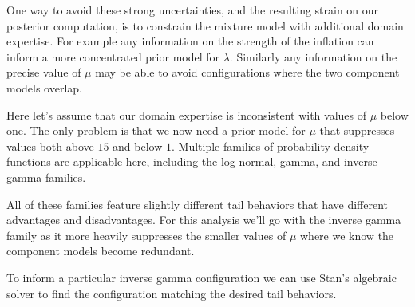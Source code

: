 \documentclass[
  letterpaper,
  DIV=11,
  numbers=noendperiod]{scrartcl}
\begin{document}
One way to avoid these strong uncertainties, and the resulting strain on
our posterior computation, is to constrain the mixture model with
additional domain expertise. For example any information on the strength
of the inflation can inform a more concentrated prior model for
\(\lambda\). Similarly any information on the precise value of \(\mu\)
may be able to avoid configurations where the two component models
overlap.

Here let's assume that our domain expertise is inconsistent with values
of \(\mu\) below one. The only problem is that we now need a prior model
for \(\mu\) that suppresses values both above \(15\) and below \(1\).
Multiple families of probability density functions are applicable here,
including the log normal, gamma, and inverse gamma families.

All of these families feature slightly different tail behaviors that
have different advantages and disadvantages. For this analysis we'll go
with the inverse gamma family as it more heavily suppresses the smaller
values of \(\mu\) where we know the component models become redundant.

To inform a particular inverse gamma configuration we can use Stan's
algebraic solver to find the configuration matching the desired tail
behaviors.
\end{document}
